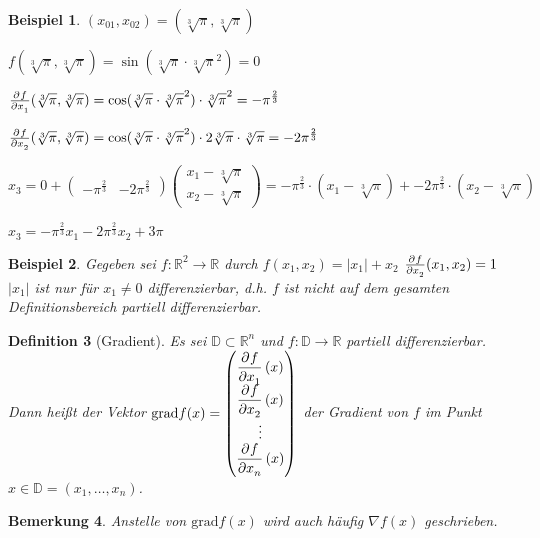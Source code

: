 \documentclass[fontset=ubuntu,12pt,a4paper]{scrreprt}
\newtheorem{defi}{Definition}[section]
\newtheorem{bemerkung}[defi]{Bemerkung}
\newtheorem{beispiel}[defi]{Beispiel}
\begin{document}
\begin{beispiel}
    
    \((x_{01},x_{02}) = (\sqrt[3]{\pi},\sqrt[3]{\pi})\)
    
    \(f(\sqrt[3]{\pi},\sqrt[3]{\pi})=\sin(\sqrt[3]{\pi}\cdot \sqrt[3]{\pi}^2) = 0\)
    
    \(\pd{f}{x_1}(\sqrt[3]{\pi},\sqrt[3]{\pi})=\cos(\sqrt[3]{\pi}\cdot \sqrt[3]{\pi}^2)\cdot \sqrt[3]{\pi}^2 = -\pi^{\frac{2}{3}}\)
    
    \(\pd{f}{x_2}(\sqrt[3]{\pi},\sqrt[3]{\pi})=\cos(\sqrt[3]{\pi}\cdot \sqrt[3]{\pi}^2)\cdot 2\sqrt[3]{\pi} \cdot \sqrt[3]{\pi} = -2\pi^{\frac{2}{3}}\)
    
    \(x_3 = 0 + \begin{pmatrix}-\pi^{\frac{2}{3}} & -2\pi^{\frac{2}{3}}\end{pmatrix} \begin{pmatrix}x_1 - \sqrt[3]{\pi} \\ x_2 - \sqrt[3]{\pi}\end{pmatrix} = -\pi^{\frac{2}{3}} \cdot (x_1 - \sqrt[3]{\pi}) + -2\pi^{\frac{2}{3}} \cdot (x_2 - \sqrt[3]{\pi})\)
    
    \(x_3 = -\pi^{\frac{2}{3}}x_1 - 2\pi^{\frac{2}{3}}x_2 + 3\pi\)
\end{beispiel}

\begin{beispiel}
    Gegeben sei \(f:\mathbb{R}^2\to\mathbb{R}\) durch \(f(x_1,x_2)=\left| x_1 \right| + x_2\)
    \(\pd{f}{x_2}(x_1,x_2)=1\)
    \(\left| x_1 \right|\) ist nur für \(x_1 \neq 0\) differenzierbar, d.h. \(f\) ist nicht auf dem gesamten Definitionsbereich partiell differenzierbar.
\end{beispiel}

\begin{defi}[Gradient]
    Es sei \(\mathbb{D} \subset \mathbb{R}^n\) und \(f:\mathbb{D} \to \mathbb{R}\) partiell differenzierbar. Dann heißt der Vektor \(\mathrm{grad} f(x) = \begin{pmatrix}
    \dpd{f}{x_1}(x) \\
    \dpd{f}{x_2}(x) \\
    \vdots \\
    \dpd{f}{x_n}(x) \\
    \end{pmatrix}\) der Gradient von \(f\) im Punkt \(x\in\mathbb{D}= (x_1,\dots,x_n)\).
\end{defi}

\begin{bemerkung}
    Anstelle von \(\mathrm{grad} f(x)\) wird auch häufig \(\nabla f(x)\) geschrieben.
\end{bemerkung}
\end{document}

